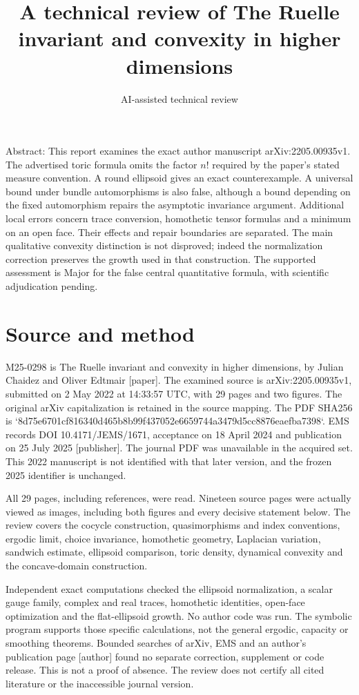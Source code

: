 \documentclass[10pt]{article}
\title{A technical review of
The Ruelle invariant and convexity in higher dimensions}
\author{AI-assisted technical review}
\date{}
\begin{document}
\maketitle
Abstract: This report examines the exact author manuscript arXiv:2205.00935v1. The advertised toric formula omits the factor \(n!\) required by the paper’s stated measure convention. A round ellipsoid gives an exact counterexample. A universal bound under bundle automorphisms is also false, although a bound depending on the fixed automorphism repairs the asymptotic invariance argument. Additional local errors concern trace conversion, homothetic tensor formulas and a minimum on an open face. Their effects and repair boundaries are separated. The main qualitative convexity distinction is not disproved; indeed the normalization correction preserves the growth used in that construction. The supported assessment is Major for the false central quantitative formula, with scientific adjudication pending.\par
\section*{Source and method}
M25-0298 is The Ruelle invariant and convexity in higher dimensions, by Julian Chaidez and Oliver Edtmair [paper]. The examined source is arXiv:2205.00935v1, submitted on 2 May 2022 at 14:33:57 UTC, with 29 pages and two figures. The original arXiv capitalization is retained in the source mapping. The PDF SHA256 is `8d75e6701cf816340d465b8b99f437052e6659744a3479d5cc8876eaefba7398`. EMS records DOI 10.4171/JEMS/1671, acceptance on 18 April 2024 and publication on 25 July 2025 [publisher]. The journal PDF was unavailable in the acquired set. This 2022 manuscript is not identified with that later version, and the frozen 2025 identifier is unchanged.\par
All 29 pages, including references, were read. Nineteen source pages were actually viewed as images, including both figures and every decisive statement below. The review covers the cocycle construction, quasimorphisms and index conventions, ergodic limit, choice invariance, homothetic geometry, Laplacian variation, sandwich estimate, ellipsoid comparison, toric density, dynamical convexity and the concave-domain construction.\par
Independent exact computations checked the ellipsoid normalization, a scalar gauge family, complex and real traces, homothetic identities, open-face optimization and the flat-ellipsoid growth. No author code was run. The symbolic program supports those specific calculations, not the general ergodic, capacity or smoothing theorems. Bounded searches of arXiv, EMS and an author’s publication page [author] found no separate correction, supplement or code release. This is not a proof of absence. The review does not certify all cited literature or the inaccessible journal version.\par
\end{document}
